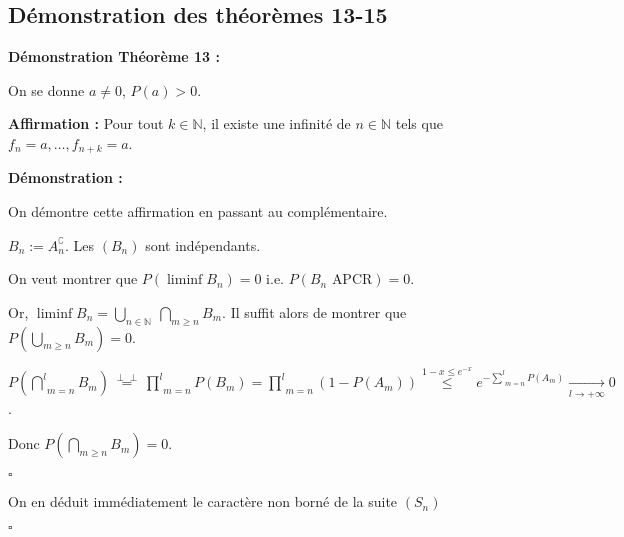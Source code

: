 \documentclass[10pt,a4paper,notitlepage ]{report}
\newcommand{\N}{\mathbb N}
\newcommand{\comp}[1]{#1^\complement}
\newcommand{\indep}{\perp \!\!\! \perp}
\newcounter{th}
\newenvironment{demo}[1][]{

	\textbf{Démonstration #1 :}
}{\begin{flushright}
	$\square$
\end{flushright}
}
\begin{document}
\subsection{Démonstration des théorèmes 13-15}

\begin{demo}[Théorème 13]
	On se donne $a\ne 0$, $P(a) > 0$.
	 
	\textbf{\quad Affirmation :} Pour tout $k\in\N$, il existe une infinité de $n\in\N$ tels que $f_n = a, \dots, f_{n+k} = a$.
	\begin{demo}
		On démontre cette affirmation en passant au complémentaire.
		
		$B_n := \comp{A_n}$. Les $(B_n)$ sont indépendants.
		
		On veut montrer que $P(\liminf B_n) = 0$ i.e. $P(B_n \text{ APCR}) = 0$.
		
		Or, $\liminf B_n = \underset {n\in\N} \bigcup \  \underset{m\ge n}\bigcap B_m$. Il suffit alors de montrer que $P(\underset{m\ge n}\bigcup B_m) = 0$.
		
		$P(\underset{m=n}{\overset l \bigcap} B_m) \overset{\indep} = \underset{m=n} {\overset l \prod} P(B_m) = \underset{m=n}{\overset l \prod}(1-P(A_m)) \overset{1-x \le e^{-x}} \le e^{-\underset{m=n}{\overset l \sum} P(A_m)} \underset{l\rightarrow +\infty} \longrightarrow 0$.
		
		Donc $P(\underset{m\ge n} \bigcap B_m) = 0$.
	\end{demo}
	
	On en déduit immédiatement le caractère non borné de la suite $(S_n)$
\end{demo}
\end{document}

